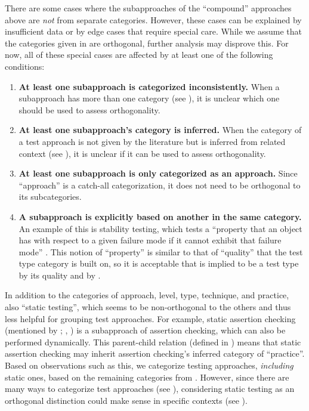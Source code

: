     There are some cases where the subapproaches of the ``compound'' approaches
    above are \emph{not} from separate categories. However, these cases can be
    explained by insufficient data or by edge cases that require special care.
    While we assume that the categories given in  are
    orthogonal, further analysis may disprove this. For now, all of these special
    cases are affected by at least one of the following conditions:
    \begin{enumerate}
        \item \textbf{At least one subapproach is categorized inconsistently.}
              When a subapproach has more than one category (see ),
              it is unclear which one should be used to assess orthogonality.
        \item \textbf{At least one subapproach's category is inferred.} When the category
              of a test approach is not given by the literature but is inferred
              from related context (see ), it is unclear if it can
              be used to assess orthogonality.
        \item \textbf{At least one subapproach is only categorized as an approach.}
              Since ``approach'' is a catch-all categorization, it does not
              need to be orthogonal to its subcategories.
        \item \textbf{A subapproach is explicitly based on another in the same
                  category.} An example of this is stability testing, which
              tests a ``property that an object has with respect to a given
              failure mode if it cannot exhibit that failure mode''
              \citep[p.~434]{IEEE2017}. This notion of
              ``property'' is similar to that of ``quality'' that the test type
              category is built on, so it is acceptable that is implied to be
              a test type by its quality \citep[p.~434]{IEEE2017}%
               and by \citet[p.~55]{Firesmith2015}.
    \end{enumerate}
\fi

In addition to the categories of approach, level, type, technique, and
practice, \citet[Fig.~2]{IEEE2022} also 
``static testing'', which seems to be non-orthogonal to the others and
thus less helpful for grouping test approaches.
For example, static assertion checking (mentioned by \ifnotpaper
    \citealp[p.~345]{LahiriEtAl2013}; \citealp[p.~343]{ChalinEtAl2006}\else
    \citealp[p.~343]{ChalinEtAl2006}, \citealp[p.~345]{LahiriEtAl2013}\fi) is a
subapproach of assertion checking, which can also be performed dynamically.
This parent-child relation (defined in ) means that static
assertion checking may inherit assertion checking's inferred category of
``practice''. Based on observations such as this, we categorize testing
approaches, \emph{including} static ones, based on the remaining categories
from \citet{IEEE2022}.
\ifnotpaper However, since there are many ways to categorize test approaches
    (see ), considering static
    testing as an orthogonal distinction could make sense in specific contexts
    (see ).

